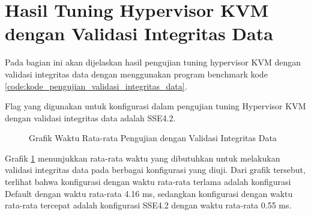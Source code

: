 \section{Hasil Tuning Hypervisor KVM dengan Validasi Integritas Data}
Pada bagian ini akan dijelaskan hasil pengujian tuning hypervisor KVM dengan validasi integritas data dengan menggunakan program benchmark kode \ref{code:kode_pengujian_validasi_integritas_data}.

Flag yang digunakan untuk konfigurasi dalam pengujian tuning Hypervisor KVM dengan validasi integritas data adalah SSE4.2.

\begin{figure}
    \centering
    \caption{Grafik Waktu Rata-rata Pengujian dengan Validasi Integritas Data}
    \label{fig:file_integrity_test_average_graph}
\end{figure}

Grafik \ref{fig:file_integrity_test_average_graph} menunjukkan rata-rata waktu yang dibutuhkan untuk melakukan validasi integritas data pada berbagai konfigurasi yang diuji. Dari grafik tersebut, terlihat bahwa konfigurasi dengan waktu rata-rata terlama adalah konfigurasi Default dengan waktu rata-rata 4.16 ms, sedangkan konfigurasi dengan waktu rata-rata tercepat adalah konfigurasi SSE4.2 dengan waktu rata-rata 0.55 ms.


